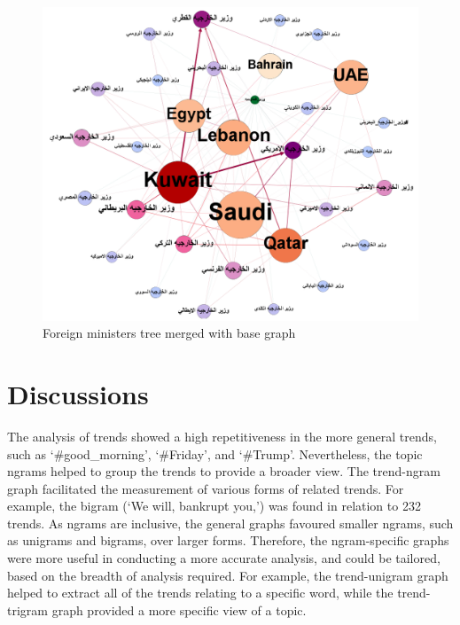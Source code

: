 \documentclass[conference]{IEEEtran}
\begin{document}
{\begin{figure}[htb] \centering
\includegraphics[width=\columnwidth]{images/ctn_graph.png}
\caption{Foreign ministers tree merged with base graph}
\label{fig:ctn_graph}
\end{figure}

\section{Discussions}\label{discussion}

The analysis of trends showed a high repetitiveness in the more general trends, 
such as ‘\#good\_morning’, ‘\#Friday’, and ‘\#Trump’. Nevertheless, the topic 
ngrams helped to group the trends to provide a broader view. The trend-ngram 
graph facilitated the measurement of various forms of related trends. 
For example, the bigram (‘We will, bankrupt you,’) was found in 
relation to 232 trends. As ngrams are inclusive, the general graphs favoured 
smaller ngrams, such as unigrams and bigrams, over larger forms. Therefore, 
the ngram-specific graphs were more useful in conducting a more accurate 
analysis, and could be tailored, based on the breadth of analysis required. 
For example, the trend-unigram graph helped to extract all of the trends relating 
to a specific word, while the trend-trigram graph provided a more specific view of a topic.
   
}
\end{document}
